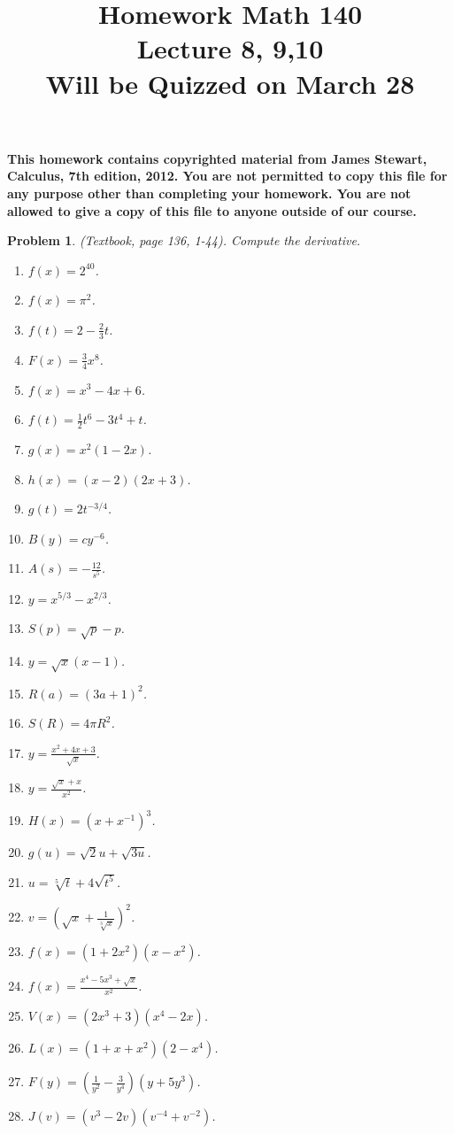 \documentclass{article}
\date{}
\title{
Homework Math 140 \\
Lecture 8, 9,10 \\
Will be Quizzed on March 28
}
\newtheorem{problem}{Problem}
\begin{document}
\maketitle
\textbf{This homework contains copyrighted material from  James Stewart, Calculus, 7th edition, 2012. 
You are not permitted to copy this file for any purpose other than completing your homework. You are not allowed to give a copy of this file to anyone outside of our course. 
}
\begin{problem} (Textbook, page 136, 1-44).
Compute the derivative.
\begin{multicols}{3}
\begin{enumerate}
\item $f(x)=2^{40}$.
\item $f(x)=\pi^2$.
\item $f(t)=2-\frac{2}{3}t$.
\item $F(x)=\frac{3}{4}x^8$.
\item $f(x)=x^3-4x+6$.
\item $f(t)=\frac{1}{2}t^6-3t^4+t$.
\item $g(x)=x^2(1-2x)$. 
\item $h(x)=(x-2)(2x+3)$.
\item $g(t)=2t^{-3/4}$.
\item $B(y)=c y^{-6}$.
\item $A(s)=-\frac{12}{s^5}$.
\item $y=x^{5/3}-x^{2/3}$.
\item $S(p)=\sqrt{p}-p$.
\item $y=\sqrt{x}(x-1)$.
\item $R(a)=(3a+1)^2$.
\item $S(R)=4\pi R^2$.
\item $y=\frac{ x^2+4x+3}{\sqrt{x}}$.
\item $y=\frac{\sqrt{x}+x}{x^2}$.
\item $H(x)=(x+x^{-1})^3$.
\item $g(u)=\sqrt 2 u +\sqrt{3u}$.
\item $u=\sqrt[5]t+4\sqrt{t^5}$.
\item $v=\left(\sqrt{x}+\frac{1}{\sqrt[3]{x}}\right)^2$.
\item $f(x)=(1+2x^2)(x-x^2)$.
\item $f(x)=\frac{x^4-5x^3+\sqrt{x}}{x^2}$.
\item $V(x)=(2x^3+3)(x^4-2x)$.
\item $L(x)=(1+x+x^2)(2-x^4)$.
\item $F(y)=\left(\frac{1}{y^2}-\frac{3}{y^4} \right)(y+5y^3)$.
\item $J(v)=(v^3-2v)(v^{-4}+v^{-2})$.

\end{enumerate}
\end{multicols}
\end{problem}
\end{document}

